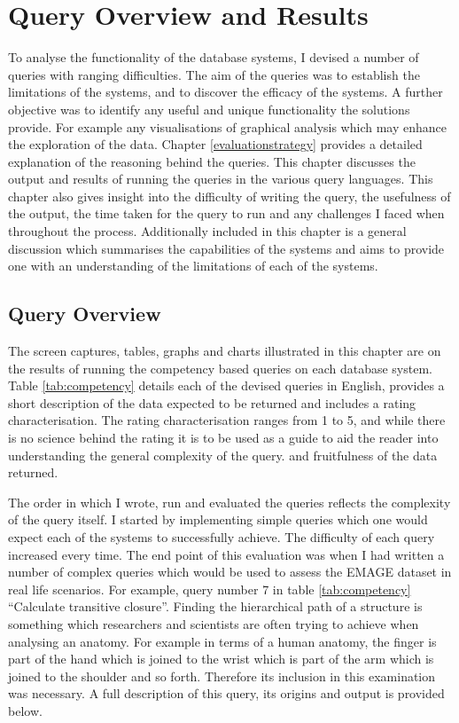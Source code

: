 \chapter{Query Overview and Results}\label{results}
To analyse the functionality of the database systems, I devised a number of queries with ranging difficulties. The aim of the queries was to establish the limitations of the systems, and to discover the efficacy of the systems. A further objective was to identify any useful and unique functionality the solutions provide. For example any visualisations of graphical analysis which may enhance the exploration of the data. Chapter \ref{evaluationstrategy} provides a detailed explanation of the reasoning behind the queries. This chapter discusses the output and results of running the queries in the various query languages. This chapter also gives insight into the difficulty of writing the query, the usefulness of the output, the time taken for the query to run and any challenges I faced when throughout the process. Additionally included in this chapter is a general discussion which summarises the capabilities of the systems and aims to provide one with an understanding of the limitations of each of the systems.

\section{Query Overview}\label{output}
The screen captures, tables, graphs and charts illustrated in this chapter are on the results of running the competency based queries on each database system. Table \ref{tab:competency} details each of the devised queries in English, provides a short description of the data expected to be returned and includes a rating characterisation. The rating characterisation ranges from 1 to 5, and while there is no science behind the rating it is to be used as a guide to aid the reader into understanding the general complexity of the query. and fruitfulness of the data returned.

The order in which I wrote, run and evaluated the queries reflects the complexity of the query itself. I started by implementing simple queries which one would expect each of the systems to successfully achieve. The difficulty of each query increased every time. The end point of this evaluation was when I had written a number of complex queries which would be used to assess the EMAGE dataset in real life scenarios. For example, query number 7 in table \ref{tab:competency} ``Calculate transitive closure''. Finding the hierarchical path of a structure is something which researchers and scientists are often trying to achieve when analysing an anatomy. For example in terms of a human anatomy, the finger is part of the hand which is joined to the wrist which is part of the arm which is joined to the shoulder and so forth. Therefore its inclusion in this examination was necessary. A full description of this query, its origins and output is provided below. 

